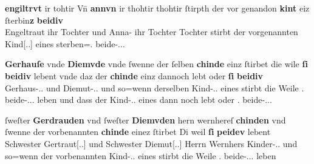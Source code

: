 \begin{exe}
\ex \label{ex:cao_beidiu_neutfem}
	\begin{xlist}
	\ex \label{ex:cao_beidiu_neutfem_1}
		\gll \textbf{engiltrvt} ir tohtir Vn̄ \textbf{annvn} ir thohtir thohtir
			\textelp{} ſtirpth der {vor genandon} \textbf{kint} eiz \textelp{}
			ſterbin\textbf{z} {\textbf{beidiv} \textelp{}} \\
			Engeltraut ihr Tochter und Anna-\Obl{} ihr Tochter Tochter {}
			stirbt der vorgenannten Kind[\Gen.\Pl.\NeutF] eines {}
			sterben=\Tpl\subF.\Nom{} beide-\Nom.\Pl.\NeutF.\St{} \\
		\begin{taggedline}{\parencites(St.~Gallen, 1284)[\pno~629, 57.24--25]{cao2}}
		\trans {}
		\end{taggedline}

	\ex \label{ex:cao_beidiu_neutfem_2}
		\gll \textbf{Gerhauſe} vnde \textbf{Diemvde} \textelp{} vnde ſwenne {der ſelben}
			\textbf{chinde} einz ſtirbet \textelp{} die wile \textbf{ſi}
			\textbf{beidiv} lebent \textelp{} vnde daz der \textbf{chinde} einz
			dannoch lebt oder \textbf{ſi} \textbf{beidiv} \\
			Gerhaus-\Dat.\Sg.\FemF{} und Diemut-\Dat.\Sg.\FemF{} {} und so=wenn
			derselben Kind-\Gen.\Pl.\NeutF{} eines stirbt {} die Weile
			\Tpl\subF.\Nom{} beide-\Nom.\Pl.\NeutF.\St{} leben {} und dass der
			Kind-\Gen.\Pl.\NeutF{} eines {dann noch} lebt oder \Tpl\subF.\Nom{}
			beide-\Nom.\Pl.\NeutF.\St{} \\
		\begin{taggedline}{\parencites(Nürnberg, 1297)[\pno~2719, 96.43--97.9]{cao4}}
		\trans {}
		\end{taggedline}

	\ex \label{ex:cao_beidiu_neutfem_3}
		\gll ſweſter \textbf{Gerdrauden} vnd ſweſter \textbf{Diemvden} hern wernhereſ
			\textbf{chinden} \textelp{} vnd ſwenne der vorbenannten \textbf{chinde}
			einez ſtirbet \textelp{} Di weil \textbf{ſi} \textbf{peidev}
			lebent \\
			Schwester Gertraut[\Dat.\Sg.\FemF] und Schwester
			Diemut[\Dat.\Sg.\FemF] Herrn Wernhers Kinder-\Dat.\Pl.\NeutF{} {}
			und so=wenn der vorbenannten Kind-\Gen.\Pl.\NeutF{} eines stirbt
			{} die Weile \Tpl\subF.\Nom{} beide-\Nom.\Pl.\NeutF.\St{} leben \\
		\begin{taggedline}{\parencites(Engelthal, Kr.~Nürnberger Land, 1298)[\pno~2960, 240.31--38]{cao4}}
		\trans {}
		\end{taggedline}
	\end{xlist}
\end{exe}

